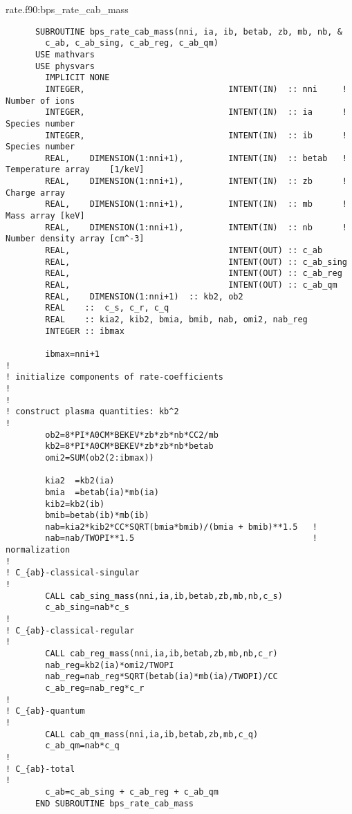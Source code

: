 \documentclass[preprint,12pt,eqsecnum,nofootinbib,amsmath,amssymb]{revtex4}
\begin{document}
{%
\vskip0.2cm 
\noindent
rate.f90:bps\_rate\_cab\_mass
{
\baselineskip 10pt
\begin{verbatim}
      SUBROUTINE bps_rate_cab_mass(nni, ia, ib, betab, zb, mb, nb, &
        c_ab, c_ab_sing, c_ab_reg, c_ab_qm)
      USE mathvars
      USE physvars
        IMPLICIT NONE
        INTEGER,                             INTENT(IN)  :: nni     !  Number of ions
        INTEGER,                             INTENT(IN)  :: ia      !  Species number
        INTEGER,                             INTENT(IN)  :: ib      !  Species number
        REAL,    DIMENSION(1:nni+1),         INTENT(IN)  :: betab   !  Temperature array    [1/keV]
        REAL,    DIMENSION(1:nni+1),         INTENT(IN)  :: zb      !  Charge array 
        REAL,    DIMENSION(1:nni+1),         INTENT(IN)  :: mb      !  Mass array [keV]
        REAL,    DIMENSION(1:nni+1),         INTENT(IN)  :: nb      !  Number density array [cm^-3]
        REAL,                                INTENT(OUT) :: c_ab
        REAL,                                INTENT(OUT) :: c_ab_sing
        REAL,                                INTENT(OUT) :: c_ab_reg
        REAL,                                INTENT(OUT) :: c_ab_qm
        REAL,    DIMENSION(1:nni+1)  :: kb2, ob2
        REAL    ::  c_s, c_r, c_q
        REAL    :: kia2, kib2, bmia, bmib, nab, omi2, nab_reg
        INTEGER :: ibmax

        ibmax=nni+1
!
! initialize components of rate-coefficients
!
!
! construct plasma quantities: kb^2
!
        ob2=8*PI*A0CM*BEKEV*zb*zb*nb*CC2/mb
        kb2=8*PI*A0CM*BEKEV*zb*zb*nb*betab
        omi2=SUM(ob2(2:ibmax))

        kia2  =kb2(ia)
        bmia  =betab(ia)*mb(ia)
        kib2=kb2(ib)
        bmib=betab(ib)*mb(ib)
        nab=kia2*kib2*CC*SQRT(bmia*bmib)/(bmia + bmib)**1.5   !
        nab=nab/TWOPI**1.5                                    ! normalization
!
! C_{ab}-classical-singular 
!
        CALL cab_sing_mass(nni,ia,ib,betab,zb,mb,nb,c_s)
        c_ab_sing=nab*c_s 
!
! C_{ab}-classical-regular 
!
        CALL cab_reg_mass(nni,ia,ib,betab,zb,mb,nb,c_r)
        nab_reg=kb2(ia)*omi2/TWOPI
        nab_reg=nab_reg*SQRT(betab(ia)*mb(ia)/TWOPI)/CC
        c_ab_reg=nab_reg*c_r  
!
! C_{ab}-quantum
!
        CALL cab_qm_mass(nni,ia,ib,betab,zb,mb,c_q)
        c_ab_qm=nab*c_q
!
! C_{ab}-total
!
        c_ab=c_ab_sing + c_ab_reg + c_ab_qm
      END SUBROUTINE bps_rate_cab_mass
\end{verbatim}

}}
\end{document}
